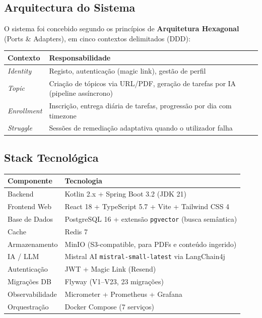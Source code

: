 \documentclass[12pt,a4paper]{article}
\begin{document}
\subsection{Arquitectura do Sistema}

O sistema foi concebido segundo os princípios de \textbf{Arquitetura Hexagonal} (Ports \& Adapters), em cinco contextos delimitados (DDD):

\begin{center}
\begin{tabular}{lp{9cm}}
\toprule
\textbf{Contexto} & \textbf{Responsabilidade} \\
\midrule
\textit{Identity} & Registo, autenticação (magic link), gestão de perfil \\
\textit{Topic}    & Criação de tópicos via URL/PDF, geração de tarefas por IA (pipeline assíncrono) \\
\textit{Enrollment} & Inscrição, entrega diária de tarefas, progressão por dia com timezone \\
\textit{Struggle} & Sessões de remediação adaptativa quando o utilizador falha \\
\bottomrule
\end{tabular}
\end{center}

\subsection{Stack Tecnológica}

\begin{center}
\begin{tabularx}{\textwidth}{lX}
\toprule
\textbf{Componente} & \textbf{Tecnologia} \\
\midrule
Backend           & Kotlin 2.x + Spring Boot 3.2 (JDK 21) \\
Frontend Web      & React 18 + TypeScript 5.7 + Vite + Tailwind CSS 4 \\
Base de Dados     & PostgreSQL 16 + extensão \texttt{pgvector} (busca semântica) \\
Cache             & Redis 7 \\
Armazenamento     & MinIO (S3-compatible, para PDFs e conteúdo ingerido) \\
IA / LLM          & Mistral AI \texttt{mistral-small-latest} via LangChain4j \\
Autenticação      & JWT + Magic Link (Resend) \\
Migrações DB      & Flyway (V1–V23, 23 migrações) \\
Observabilidade   & Micrometer + Prometheus + Grafana \\
Orquestração      & Docker Compose (7 serviços) \\
\bottomrule
\end{tabularx}
\end{center}
\end{document}
